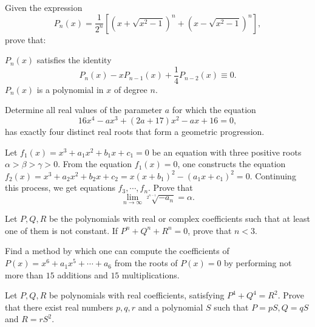 \documentclass[12pt,a4paper]{memoir}
\theoremstyle{definition}
\begin{document}
\begin{question}[name={1978 IMO Longlist}]
	Given the expression
	\[P_n(x) =\frac{1}{2^n}\left[(x +\sqrt{x^2 - 1})^n+(x-\sqrt{x^2 - 1})^n\right],\]
	prove that:
	\begin{tasks}
		\task $P_n(x)$ satisfies the identity
		\[P_n(x) - xP_{n-1}(x) + \frac{1}{4}P_{n-2}(x) \equiv 0.\]
		\task $P_n(x)$ is a polynomial in $x$ of degree $n.$
	\end{tasks}
\end{question}

\begin{question}[name={1982 IMO Longlist}]
	Determine all real values of the parameter $a$ for which the equation
	\[16x^4 -ax^3 + (2a + 17)x^2 -ax + 16 = 0,\]
	has exactly four distinct real roots that form a geometric progression.
\end{question}

\begin{question}[name={1984 IMO Longlist}]
	Let $f_1(x) = x^3+a_1x^2+b_1x+c_1 = 0$ be an equation with three positive roots $\alpha>\beta>\gamma > 0$. From the equation $f_1(x) = 0$, one constructs the equation $f_2(x) = x^3 +a_2x^2 +b_2x+c_2 = x(x+b_1)^2 -(a_1x+c_1)^2 = 0$. Continuing this process, we get equations $f_3,\cdots, f_n$. Prove that
	\[\lim_{n\to\infty}\sqrt[2^{n-1}]{-a_n} = \alpha.\]
\end{question}

\begin{question}[name={1984 IMO Longlist}]
	Let $P,Q,R$ be the polynomials with real or complex coefficients such that at least one of them is not constant. If $P^n+Q^n+R^n = 0$, prove that $n < 3.$
\end{question}



\begin{question}[name={1985 IMO Longlist}]
	Find a method by which one can compute the coefficients of $P(x) = x^6 + a_1x^5 + \cdots+  a_6$ from the roots of $P(x) = 0$ by performing not more than $15$ additions and $15$ multiplications.
\end{question}

\begin{question}[name={1987 IMO Longlist}]
	Let $P,Q,R$ be polynomials with real coefficients, satisfying $P^4+Q^4 = R^2$. Prove that there exist real numbers $p, q, r$ and a polynomial $S$ such that $P = pS, Q = qS$ and $R = rS^2$.
\end{question}
\end{document}
